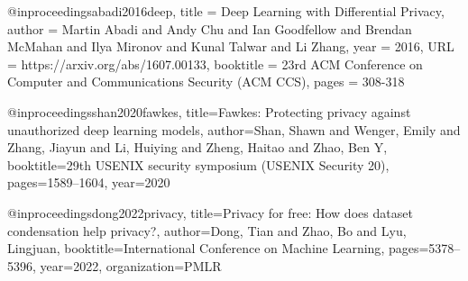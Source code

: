 @inproceedings{abadi2016deep,
title	= {Deep Learning with Differential Privacy},
author	= {Martin Abadi and Andy Chu and Ian Goodfellow and Brendan McMahan and Ilya Mironov and Kunal Talwar and Li Zhang},
year	= {2016},
URL	= {https://arxiv.org/abs/1607.00133},
booktitle	= {23rd ACM Conference on Computer and Communications Security (ACM CCS)},
pages	= {308-318}
}

@inproceedings{shan2020fawkes,
  title={Fawkes: Protecting privacy against unauthorized deep learning models},
  author={Shan, Shawn and Wenger, Emily and Zhang, Jiayun and Li, Huiying and Zheng, Haitao and Zhao, Ben Y},
  booktitle={29th USENIX security symposium (USENIX Security 20)},
  pages={1589--1604},
  year={2020}
}

@inproceedings{dong2022privacy,
  title={Privacy for free: How does dataset condensation help privacy?},
  author={Dong, Tian and Zhao, Bo and Lyu, Lingjuan},
  booktitle={International Conference on Machine Learning},
  pages={5378--5396},
  year={2022},
  organization={PMLR}
}

